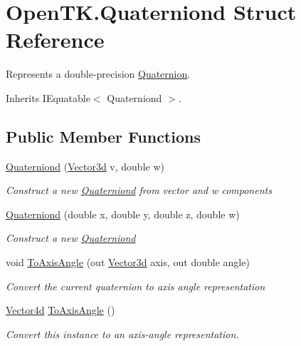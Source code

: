 \hypertarget{struct_open_t_k_1_1_quaterniond}{\section{Open\-T\-K.\-Quaterniond Struct Reference}
\label{struct_open_t_k_1_1_quaterniond}
}


Represents a double-\/precision \hyperlink{struct_open_t_k_1_1_quaternion}{Quaternion}.  




Inherits I\-Equatable$<$ Quaterniond $>$.

\subsection*{Public Member Functions}
\begin{DoxyCompactItemize}
\item 
\hyperlink{struct_open_t_k_1_1_quaterniond_a1ee2a28457c7e883a659acec6f5b5d47}{Quaterniond} (\hyperlink{struct_open_t_k_1_1_vector3d}{Vector3d} v, double w)
\begin{DoxyCompactList}\small\item\em Construct a new \hyperlink{struct_open_t_k_1_1_quaterniond}{Quaterniond} from vector and w components \end{DoxyCompactList}\item 
\hyperlink{struct_open_t_k_1_1_quaterniond_a4953ca5777002ec5c80853e61ee80b28}{Quaterniond} (double x, double y, double z, double w)
\begin{DoxyCompactList}\small\item\em Construct a new \hyperlink{struct_open_t_k_1_1_quaterniond}{Quaterniond} \end{DoxyCompactList}\item 
void \hyperlink{struct_open_t_k_1_1_quaterniond_a98e59d928b8269c719d328fa14eb82ca}{To\-Axis\-Angle} (out \hyperlink{struct_open_t_k_1_1_vector3d}{Vector3d} axis, out double angle)
\begin{DoxyCompactList}\small\item\em Convert the current quaternion to axis angle representation \end{DoxyCompactList}\item 
\hyperlink{struct_open_t_k_1_1_vector4d}{Vector4d} \hyperlink{struct_open_t_k_1_1_quaterniond_accfe115adc1ec4bf1f184ab9f33ad3f1}{To\-Axis\-Angle} ()
\begin{DoxyCompactList}\small\item\em Convert this instance to an axis-\/angle representation. \end{DoxyCompactList}\item 

\end{DoxyCompactItemize}
